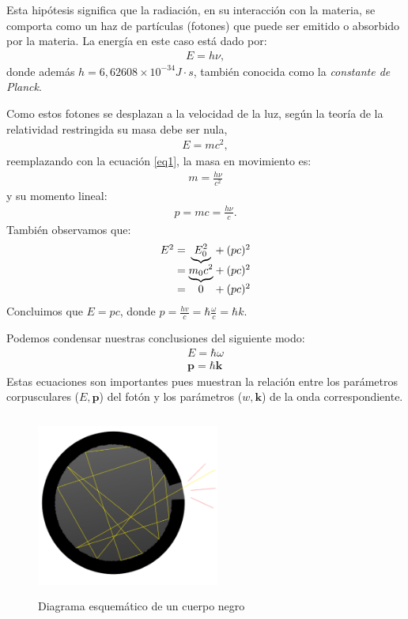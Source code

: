 \documentclass[../main]{subfiles}
\begin{document}
Esta hipótesis significa que la radiación, en su interacción con la materia, se comporta como un haz de partículas (fotones) que puede ser emitido o absorbido por la materia. La energía en este caso está dado por:
\begin{align}
    E=h\nu,
\end{align}
donde además $h=6,62608\times10^{-34} J\cdot s$, también conocida como la \textit{constante de Planck}.

Como estos fotones se desplazan a la velocidad de la luz, según la teoría de la relatividad restringida su masa debe ser nula, 
\begin{align}
    E=mc^2,
\end{align}
reemplazando con la ecuación \ref{eq1}, la masa en movimiento es:
\begin{align}
    m=\frac{h\nu}{c^2}
\end{align}
y su momento lineal:
\begin{align}
    p=mc=\frac{h\nu}{c}.
\end{align}
También observamos que:
\begin{align}
    \begin{array}{r@{{}\mathrel{=}{}}c*{1}{@{{}\mathbin{+}{}}c}}
        E^2 & \underbrace{E^2_0} & (pc)^2 \\[\jot]
          &  \underbrace{m_0 c^2}  &  (pc)^2\\
          & 0 & (pc)^2\\
    \end{array}
\end{align}
Concluimos que $E=pc$, donde $\displaystyle p=\frac{hv}{c}=\hbar\frac{\omega}{c}=\hbar k$.

Podemos condensar nuestras conclusiones del siguiente modo:
\begin{align}
    E=\hbar\omega\\
    \boldsymbol{p}=\hbar \boldsymbol{k}
\end{align}
Estas ecuaciones son importantes pues muestran la relación entre los parámetros corpusculares ($E, \boldsymbol{p}$) del fotón y los parámetros ($w, \boldsymbol{k}$) de la onda correspondiente.
\begin{figure}[h]
    \centering
    \includegraphics[width=6cm,height=6cm,keepaspectratio]{Física Moderna/General/img/1.png}
    \caption{Diagrama esquemático de un cuerpo negro}
    \label{fig:cuerpo_negro}
\end{figure}
\end{document}
